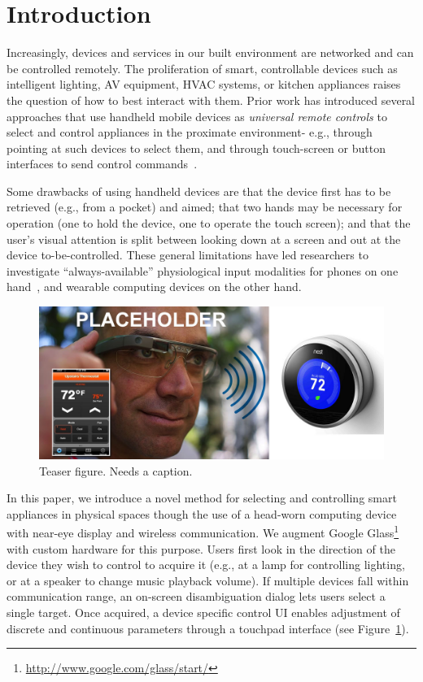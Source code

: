 \section{Introduction}
Increasingly, devices and services in our built environment are networked and can be controlled remotely. The proliferation of smart, controllable devices such as intelligent lighting, AV equipment, HVAC systems, or kitchen appliances raises the question of how to best interact with them. Prior work has introduced several approaches that use handheld mobile devices as {\em universal remote controls} to select and control appliances in the proximate environment- e.g., through pointing at such devices to select them, and through touch-screen or button interfaces to send control commands~\cite{beigl_point_1999,patel_2-way_2003}.

Some drawbacks of using handheld devices are that the device first has to be retrieved (e.g., from a pocket) and aimed; that two hands may be necessary for operation (one to hold the device, one to operate the touch screen); and that the user's visual attention is split between looking down at a screen and out at the device to-be-controlled.  These general limitations have led researchers to investigate ``always-available'' physiological input modalities for phones on one hand~\cite{morris_emerging_2011}, and wearable computing devices on the other hand.

\begin{figure}[t]
\centering
\includegraphics[width=1.0\columnwidth]{figures/teaser}
\caption{Teaser figure. Needs a caption.}
\label{fig:teaser}
\end{figure}

In this paper, we introduce a novel method for selecting and controlling smart appliances in physical spaces though the use of a head-worn computing device with near-eye display and wireless communication. We augment Google Glass\footnote{\url{http://www.google.com/glass/start/}} with custom hardware for this purpose. Users first look in the direction of the device they wish to control to acquire it (e.g., at a lamp for controlling lighting, or at a speaker to change music playback volume). If multiple devices fall within communication range, an on-screen disambiguation dialog lets users select a single target. Once acquired, a device specific control UI enables adjustment of discrete and continuous parameters through a touchpad interface (see Figure~\ref{fig:teaser}).

